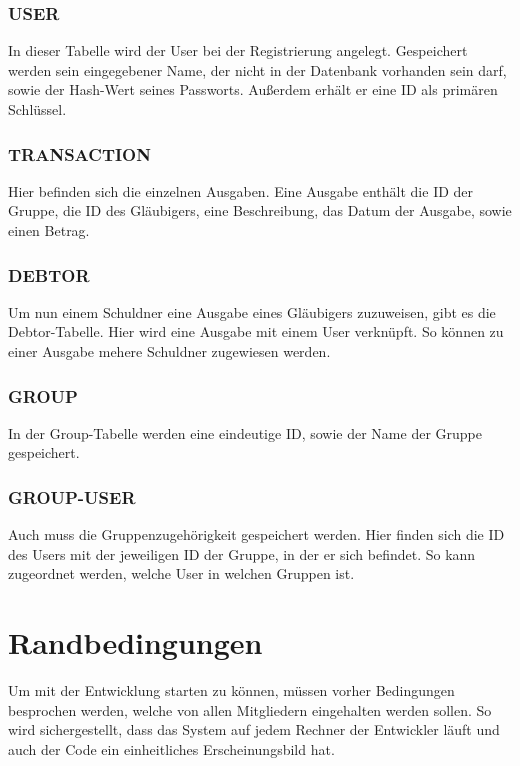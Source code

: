 \documentclass[conference]{IEEEtran}
\begin{document}
\subsubsection{USER}
In dieser Tabelle wird der User bei der Registrierung angelegt. Gespeichert werden sein eingegebener Name, der nicht in der Datenbank vorhanden sein darf, sowie der \gls{Hash-Wert} seines Passworts.
Außerdem erhält er eine ID als primären Schlüssel.
\subsubsection{TRANSACTION}
Hier befinden sich die einzelnen Ausgaben. Eine Ausgabe enthält die ID der Gruppe, die ID des Gläubigers, eine Beschreibung, das Datum der Ausgabe, sowie einen Betrag.
\subsubsection{DEBTOR}
Um nun einem \gls{Schuldner} eine Ausgabe eines Gläubigers zuzuweisen, gibt es die Debtor-Tabelle.
Hier wird eine Ausgabe mit einem User verknüpft. So können zu einer Ausgabe mehere Schuldner zugewiesen werden.
\subsubsection{GROUP}
In der Group-Tabelle werden eine eindeutige ID, sowie der Name der Gruppe gespeichert.
\subsubsection{GROUP-USER}
Auch muss die Gruppenzugehörigkeit gespeichert werden. Hier finden sich die ID des Users mit der jeweiligen ID der Gruppe, in der er sich befindet.
So kann zugeordnet werden, welche User in welchen Gruppen ist.


\section{Randbedingungen}
Um mit der Entwicklung starten zu können, müssen vorher Bedingungen besprochen werden, welche von allen Mitgliedern eingehalten werden sollen.
So wird sichergestellt, dass das System auf jedem Rechner der Entwickler läuft und auch der Code ein einheitliches Erscheinungsbild hat.
\end{document}
